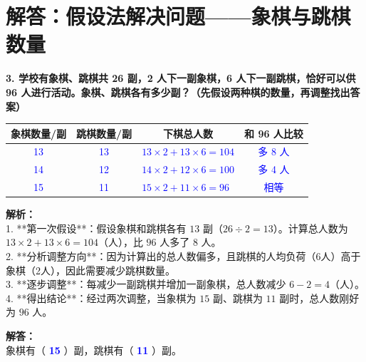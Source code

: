 \documentclass[12pt, a4paper]{ctexrep}
\begin{document}
\newpage

\section{解答：假设法解决问题——象棋与跳棋数量}

\vspace{0.4cm}

\noindent\textbf{3. 学校有象棋、跳棋共 26 副，2 人下一副象棋，6 人下一副跳棋，恰好可以供 96 人进行活动。象棋、跳棋各有多少副？（先假设两种棋的数量，再调整找出答案）}

\vspace{0.8cm}

\begin{center}
\renewcommand{\arraystretch}{1.8}
\begin{tabular}{|c|c|l|c|}
\hline
\textbf{象棋数量/副} & \textbf{跳棋数量/副} & \multicolumn{1}{c|}{\textbf{下棋总人数}} & \textbf{和 96 人比较} \\ \hline
\textcolor{blue}{13} & \textcolor{blue}{13} & \textcolor{blue}{$13 \times 2 + 13 \times 6 = 104$} & \textcolor{blue}{多 8 人} \\ \hline
\textcolor{blue}{14} & \textcolor{blue}{12} & \textcolor{blue}{$14 \times 2 + 12 \times 6 = 100$} & \textcolor{blue}{多 4 人} \\ \hline
\textcolor{blue}{15} & \textcolor{blue}{11} & \textcolor{blue}{$15 \times 2 + 11 \times 6 = 96$} & \textcolor{blue}{相等} \\ \hline
\end{tabular}
\end{center}

\vspace{0.6cm}

{\small\color{gray}
\textbf{解析：}\\
1. **第一次假设**：假设象棋和跳棋各有 $13$ 副（$26 \div 2 = 13$）。计算总人数为 $13 \times 2 + 13 \times 6 = 104$（人），比 $96$ 人多了 $8$ 人。\\
2. **分析调整方向**：因为计算出的总人数偏多，且跳棋的人均负荷（6人）高于象棋（2人），因此需要减少跳棋数量。\\
3. **逐步调整**：每减少一副跳棋并增加一副象棋，总人数减少 $6 - 2 = 4$（人）。\\
4. **得出结论**：经过两次调整，当象棋为 $15$ 副、跳棋为 $11$ 副时，总人数刚好为 $96$ 人。
}

\vspace{0.4cm}
\noindent\textbf{解答：}\\
象棋有（ \textbf{\textcolor{blue}{15}} ）副，跳棋有（ \textbf{\textcolor{blue}{11}} ）副。
\end{document}

